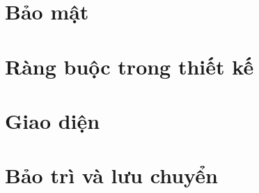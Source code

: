 \documentclass[12pt, a4paper]{article}
\begin{document}
	\section{Bảo mật}
	
	
	\section{Ràng buộc trong thiết kế}
	
	
	\section{Giao diện}
	
	
	\section{Bảo trì và lưu chuyển}
	
	
	
	
\end{document}
